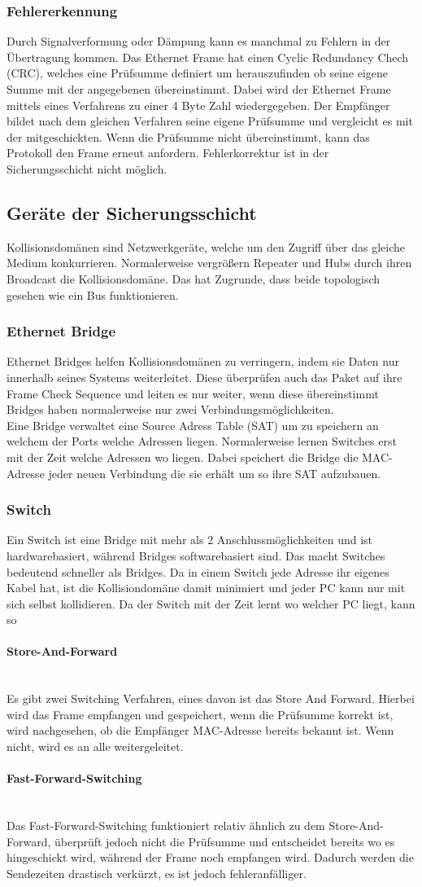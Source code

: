 \documentclass{article}
\newcommand{\paragraphlb}[1]{\paragraph{#1}\mbox{}\\}
\begin{document}
	 \subsubsection{Fehlererkennung}
	 Durch Signalverformung oder Dämpung kann es manchmal zu Fehlern in der Übertragung kommen. Das Ethernet Frame hat einen Cyclic Redundancy Chech (CRC), welches eine Prüfsumme definiert um herauszufinden ob seine eigene Summe mit der angegebenen übereinstimmt. Dabei wird der Ethernet Frame mittels eines Verfahrens zu einer 4 Byte Zahl wiedergegeben. Der Empfänger bildet nach dem gleichen Verfahren seine eigene Prüfsumme und vergleicht es mit der mitgeschickten. Wenn die Prüfsumme nicht übereinstimmt, kann das Protokoll den Frame erneut anfordern. Fehlerkorrektur ist in der Sicherungsschicht nicht möglich.\\
	 \subsection{Geräte der Sicherungsschicht}
	 Kollisionsdomänen sind Netzwerkgeräte, welche um den Zugriff über das gleiche Medium konkurrieren. Normalerweise vergrößern Repeater und Hubs durch ihren Broadcast die Kollisionsdomäne. Das hat Zugrunde, dass beide topologisch gesehen wie ein Bus funktionieren.
	 \subsubsection{Ethernet Bridge}
	 Ethernet Bridges helfen Kollisionsdomänen zu verringern, indem sie Daten nur innerhalb seines Systems weiterleitet. Diese überprüfen auch das Paket auf ihre Frame Check Sequence und leiten es nur weiter, wenn diese übereinstimmt Bridges haben normalerweise nur zwei Verbindungsmöglichkeiten. \\
	 Eine Bridge verwaltet eine Source Adress Table (SAT) um zu speichern an welchem der Ports welche Adressen liegen. Normalerweise lernen Switches erst mit der Zeit welche Adressen wo liegen. Dabei speichert die Bridge die MAC-Adresse jeder neuen Verbindung die sie erhält um so ihre SAT aufzubauen.
	 \subsubsection{Switch}
	 Ein Switch ist eine Bridge mit mehr als 2 Anschlussmöglichkeiten und ist hardwarebasiert, während Bridges softwarebasiert sind. Das macht Switches bedeutend schneller als Bridges. Da in einem Switch jede Adresse ihr eigenes Kabel hat, ist die Kollisiondomäne damit minimiert und jeder PC kann nur mit sich selbst kollidieren. Da der Switch mit der Zeit lernt wo welcher PC liegt, kann so
	 \paragraphlb{Store-And-Forward}
	 Es gibt zwei Switching Verfahren, eines davon ist das Store And Forward. Hierbei wird das Frame empfangen und gespeichert, wenn die Prüfsumme korrekt ist, wird nachgesehen, ob die Empfänger MAC-Adresse bereits bekannt ist. Wenn nicht, wird es an alle weitergeleitet. 
	 \paragraphlb{Fast-Forward-Switching}
	 Das Fast-Forward-Switching funktioniert relativ ähnlich zu dem Store-And-Forward, überprüft jedoch nicht die Prüfsumme und entscheidet bereits wo es hingeschickt wird, während der Frame noch empfangen wird. Dadurch werden die Sendezeiten drastisch verkürzt, es ist jedoch fehleranfälliger.
\end{document}
